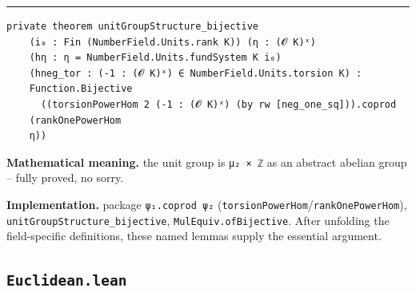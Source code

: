 \documentclass[UTF8,a4paper,11pt,fontset=fandol]{ctexart}
\theoremstyle{definition}
\newcommand{\statementsep}{\par\medskip\hrule\medskip}
\begin{document}
\statementsep
\begin{verbatim}
private theorem unitGroupStructure_bijective
    (i₀ : Fin (NumberField.Units.rank K)) (η : (𝓞 K)ˣ)
    (hη : η = NumberField.Units.fundSystem K i₀)
    (hneg_tor : (-1 : (𝓞 K)ˣ) ∈ NumberField.Units.torsion K) :
    Function.Bijective
      ((torsionPowerHom 2 (-1 : (𝓞 K)ˣ) (by rw [neg_one_sq])).coprod
    (rankOnePowerHom
    η))
\end{verbatim}
\noindent\textbf{Mathematical meaning.} the unit group is \texttt{μ₂ × ℤ} as an abstract abelian group -- fully proved, no sorry.\par
\noindent\textbf{Implementation.} package \texttt{ψ₁.\allowbreak{}coprod ψ₂} (\texttt{torsionPowerHom}/\texttt{rankOnePowerHom}), \texttt{unitGroupStructure\_\allowbreak{}bijective}, \texttt{MulEquiv.\allowbreak{}ofBijective}. After unfolding the field-specific definitions, these named lemmas supply the essential argument.\par

\subsection{\texttt{Euclidean.lean}}
\end{document}
